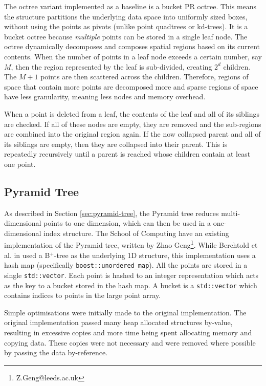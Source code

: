 The octree variant implemented as a baseline is a bucket PR octree. This means the structure partitions the underlying data space into uniformly sized boxes, without using the points as pivots (unlike point quadtrees or kd-trees). It is a bucket octree because \textit{multiple} points can be stored in a single leaf node. The octree dynamically decomposes and composes spatial regions based on its current contents. When the number of points in a leaf node exceeds a certain number, say $M$, then the region represented by the leaf is sub-divided, creating $2^d$ children. The $M + 1$ points are then scattered across the children. Therefore, regions of space that contain more points are decomposed more and sparse regions of space have less granularity, meaning less nodes and memory overhead.

When a point is deleted from a leaf, the contents of the leaf and all of its siblings are checked. If all of these nodes are empty, they are removed and the sub-regions are combined into the original region again. If the now collapsed parent and all of its siblings are empty, then they are collapsed into their parent. This is repeatedly recursively until a parent is reached whose children contain at least one point.

\subsection{Pyramid Tree}

As described in Section \ref{sec:pyramid-tree}, the Pyramid tree reduces multi-dimensional points to one dimension, which can then be used in a one-dimensional index structure. The School of Computing have an existing implementation of the Pyramid tree, written by Zhao Geng\footnote{Z.Geng@leeds.ac.uk}. While Berchtold et al. in \cite{pyramid-tree} used a B${}^{+}$-tree as the underlying 1D structure, this implementation uses a hash map (specifically \texttt{boost::unordered\_map}). All the points are stored in a single \texttt{std::vector}. Each point is hashed to an integer representation which acts as the key to a bucket stored in the hash map. A bucket is
 a \texttt{std::vector} which contains indices to points in the large point array.
 
Simple optimisations were initially made to the original implementation. The original implementation passed many heap allocated structures by-value, resulting in excessive copies and more time being spent allocating memory and copying data. These copies were not necessary and were removed where possible by passing the data by-reference.

